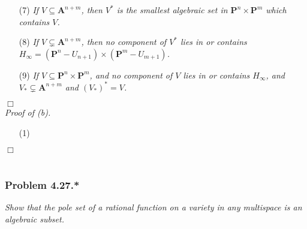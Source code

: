 \documentclass{article}
\begin{document}
\begin{enumerate}
\item[(7)]
  \emph{If $V \subseteq \mathbf{A}^{n+m}$,
  then $V^{*}$ is the smallest algebraic set in $\mathbf{P}^{n} \times \mathbf{P}^{m}$
  which contains $V$.}

\item[(8)]
  \emph{If $V \subsetneq \mathbf{A}^{n+m}$,
  then no component of $V^{*}$ lies in or contains
  $H_{\infty} = (\mathbf{P}^{n}-U_{n+1}) \times (\mathbf{P}^{m}-U_{m+1})$.}

\item[(9)]
  \emph{If $V \subseteq \mathbf{P}^{n} \times \mathbf{P}^{m}$,
  and no component of $V$ lies in or contains $H_{\infty}$,
  and $V_{*} \subsetneq \mathbf{A}^{n+m}$ and $(V_{*})^{*} = V$.}

\end{enumerate}
$\Box$ \\



\emph{Proof of (b).}
\begin{enumerate}
\item[(1)]
\end{enumerate}
$\Box$ \\\\






\subsubsection*{Problem 4.27.*}
\emph{Show that the pole set of a rational function on a variety in any multispace is
an algebraic subset.} \\
\end{document}
